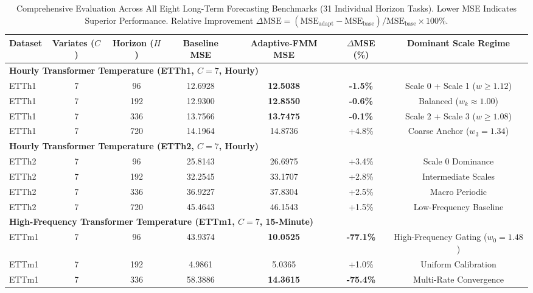 \documentclass[journal]{IEEEtran}
\begin{document}
\begin{table}[!t]
\centering
\caption{Comprehensive Evaluation Across All Eight Long-Term Forecasting Benchmarks (31 Individual Horizon Tasks). Lower MSE Indicates Superior Performance. Relative Improvement $\Delta\text{MSE} = (\text{MSE}_{\text{adapt}} - \text{MSE}_{\text{base}}) / \text{MSE}_{\text{base}} \times 100\%$.}
\label{tab:all_benchmarks}
\footnotesize
\setlength{\tabcolsep}{6.5pt}
\begin{tabular}{lcccccc}
\toprule
Dataset & Variates ($C$) & Horizon ($H$) & Baseline MSE & Adaptive-FMM MSE & $\Delta$MSE (\%) & Dominant Scale Regime \\
\midrule
\multicolumn{7}{l}{\textbf{Hourly Transformer Temperature (ETTh1, $C=7$, Hourly)}} \\
ETTh1 & 7 & 96 & 12.6928 & \textbf{12.5038} & \textbf{-1.5\%} & Scale 0 + Scale 1 ($w \ge 1.12$) \\
ETTh1 & 7 & 192 & 12.9300 & \textbf{12.8550} & \textbf{-0.6\%} & Balanced ($w_k \approx 1.00$) \\
ETTh1 & 7 & 336 & 13.7566 & \textbf{13.7475} & \textbf{-0.1\%} & Scale 2 + Scale 3 ($w \ge 1.08$) \\
ETTh1 & 7 & 720 & 14.1964 & 14.8736 & +4.8\% & Coarse Anchor ($w_3 = 1.34$) \\
\midrule
\multicolumn{7}{l}{\textbf{Hourly Transformer Temperature (ETTh2, $C=7$, Hourly)}} \\
ETTh2 & 7 & 96 & 25.8143 & 26.6975 & +3.4\% & Scale 0 Dominance \\
ETTh2 & 7 & 192 & 32.2545 & 33.1707 & +2.8\% & Intermediate Scales \\
ETTh2 & 7 & 336 & 36.9227 & 37.8304 & +2.5\% & Macro Periodic \\
ETTh2 & 7 & 720 & 45.4643 & 46.1543 & +1.5\% & Low-Frequency Baseline \\
\midrule
\multicolumn{7}{l}{\textbf{High-Frequency Transformer Temperature (ETTm1, $C=7$, 15-Minute)}} \\
ETTm1 & 7 & 96 & 43.9374 & \textbf{10.0525} & \textbf{-77.1\%} & High-Frequency Gating ($w_0 = 1.48$) \\
ETTm1 & 7 & 192 & 4.9861 & 5.0365 & +1.0\% & Uniform Calibration \\
ETTm1 & 7 & 336 & 58.3886 & \textbf{14.3615} & \textbf{-75.4\%} & Multi-Rate Convergence \\

\end{tabular}
\end{table}
\end{document}
